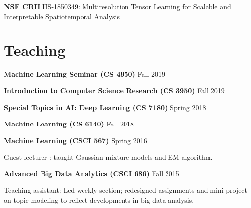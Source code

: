 \documentclass[margin,line]{res}
\begin{document}
\begin{resume}
 {\bf  NSF CRII}     {IIS-1850349: Multiresolution Tensor Learning for Scalable and Interpretable Spatiotemporal Analysis} 
 
 

\section{\sc Teaching }
 {\bf Machine Learning Seminar (CS 4950)}   \hfill  { Fall 2019} 

 {\bf Introduction to Computer Science Research (CS 3950)}   \hfill  { Fall 2019} 
 
 {\bf Special Topics in AI: Deep Learning (CS 7180)}   \hfill  { Spring 2018} 


 {\bf Machine Learning (CS 6140)}   \hfill  { Fall 2018 } 


 {\bf Machine Learning (CSCI 567)}   \hfill  { Spring 2016 } 
 
 \vspace{-.3cm}
 Guest  lecturer : taught Gaussian mixture models and EM algorithm.
 
 
 {\bf Advanced Big Data Analytics (CSCI 686)}   \hfill  {Fall 2015} 
 
 \vspace{-.3cm}
Teaching assistant: Led weekly section; redesigned assignments and mini-project on topic modeling to reflect developments in big data analysis. 





\end{resume}
\end{document}
